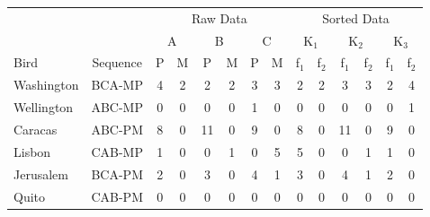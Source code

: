 \begin{tabular}{l|c|cccccc||cccccc}
\multicolumn{2}{c|}{} & \multicolumn{6}{c||}{\cellcolor{gray!20} Raw Data} & \multicolumn{6}{c}{\cellcolor{gray!20}Sorted Data}\\
 \multicolumn{2}{c|}{} & \multicolumn{2}{c}{A} &
    \multicolumn{2}{c}{B} & \multicolumn{2}{c||}{C} &
    \multicolumn{2}{c}{K$_1$}  & \multicolumn{2}{c}{K$_2$} &
    \multicolumn{2}{c}{K$_3$} \\Bird & Sequence & P & M & P & M & P & M & f$_1$ & f$_2$  & f$_1$  & f$_2$  & f$_1$  & f$_2$
          \\\midrule
Washington & BCA-MP & 4 & 2 & 2 & 2 & 3 & 3 & 2 & 2 & 3 & 3 & 2 & 4 \\
Wellington & ABC-MP & 0 & 0 & 0 & 0 & 1 & 0 & 0 & 0 & 0 & 0 & 0 & 1 \\
Caracas & ABC-PM & 8 & 0 & 11 & 0 & 9 & 0 & 8 & 0 & 11 & 0 & 9 & 0 \\
Lisbon & CAB-MP & 1 & 0 & 0 & 1 & 0 & 5 & 5 & 0 & 0 & 1 & 1 & 0 \\
Jerusalem & BCA-PM & 2 & 0 & 3 & 0 & 4 & 1 & 3 & 0 & 4 & 1 & 2 & 0 \\
Quito & CAB-PM & 0 & 0 & 0 & 0 & 0 & 0 & 0 & 0 & 0 & 0 & 0 & 0 \\
\end{tabular}